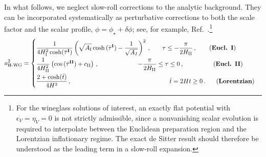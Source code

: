 \documentclass[a4paper,11pt]{article}
\newcommand{\purple}[1]{{\color{purple} #1 \color{black}}}
\newcommand{\PG}[1]{{\purple{PG: #1}}} %
\begin{document}
In what follows, we neglect slow-roll corrections to the analytic background. They can be incorporated systematically as perturbative corrections to both the scale factor and the scalar profile,
$\phi=\phi_\star+\delta\phi$; see, for example, Ref.~\cite{Maldacena:2004rf}.\footnote{
For the wineglass solutions of interest, an exactly flat potential with
$\epsilon_V=\eta_V=0$ is not strictly admissible, since a nonvanishing scalar evolution is required to interpolate between the Euclidean preparation region and the Lorentzian inflationary regime. The exact de Sitter result should therefore be understood as the leading term in a slow-roll expansion.}
\begin{equation}
 a_{\rm H\text{-}WG}^2 = 
    \begin{cases}
   \displaystyle   \frac{1}{4 H_{\rm I}^2\cosh(\bar{\tau}^{\textbf{I}})}\left(\sqrt{A_{\rm I}}\cosh{(\bar{\tau}^{\textbf{I}})}-\frac{1}{\sqrt{A_{I}}}\right)^2\,, \quad\,\,\,\,\, \tau \leq -\frac{\pi}{2H_{\rm II}}\,,  \hspace{0.7cm}   (\textbf{Eucl.  I})&
\\[0.3cm]
   \displaystyle     \frac{1}{4 H_{\rm II}^2} \left(\cos{(\bar{\tau}^{\textbf{II}})}+ c_{\rm II}\right)\,,  \hspace{2.2cm}  -\frac{\pi}{2H_{\rm II}} \leq \tau \leq 0\,,  \hspace{1.65cm}  (\textbf{Eucl. II}) &
\\[0.3cm]
  \displaystyle     \frac{2+\cosh(\bar{t})}{4H^2} \,, \hspace{5.5cm}  \bar{t} = 2Ht \geq0\,. \hspace{0.6cm} (\textbf{Lorentzian})&  
\end{cases}
\label{eq:background_ans_simple_2}
\end{equation}
\end{document}
